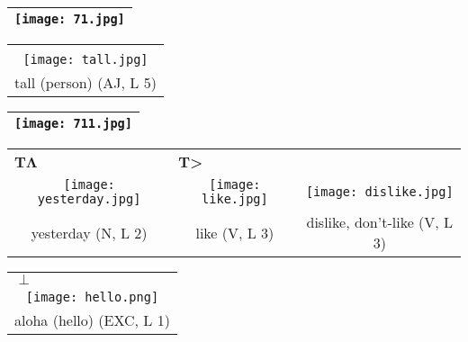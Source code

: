 \documentclass{tufte-book}
\newcommand{\sansnormal}{\sffamily\selectfont}
\begin{document}
\begin{fullwidth}
\begin{table}[h!]
\begin{tabular}{|c|}
\hline
\texttt{[image: 71.jpg]}\\
 
 \hline
\end{tabular}
\label{page:71}
\end{table}

 \begin{table*}[h!]
\begin{tabular}{c}
 \multicolumn{1}{l}{}\\
   \texttt{[image: tall.jpg]}\\
   tall (person) (AJ, L 5) \\%
 
 
 
\end{tabular}
\end{table*}


\begin{table}[h!]
\begin{tabular}{|c|}
\hline
\texttt{[image: 711.jpg]}\\
 
 \hline
\end{tabular}
\label{page:711}
\end{table}

 \begin{table*}[h!]
\begin{tabular}{ccc}
 \multicolumn{1}{l}{\textbf{\sansnormal T}$\mathbf\Lambda$}&\multicolumn{1}{l}{\textbf{{\sansnormal T}>}}&  \\
   \texttt{[image: yesterday.jpg]}& \texttt{[image: like.jpg]}&  \texttt{[image: dislike.jpg]}\\
   yesterday (N, L 2) & like (V, L 3)& dislike, don't-like (V, L 3)\\%
  \end{tabular}
\end{table*}
\newpage

 \begin{table*}[h!]
\begin{tabular}{c}
 \multicolumn{1}{l}{$\pmb\perp$}\\
   \texttt{[image: hello.png]}\\
   aloha (hello) (EXC, L 1) \\%
 

\end{tabular}
\end{table*}
\end{fullwidth}
\end{document}
